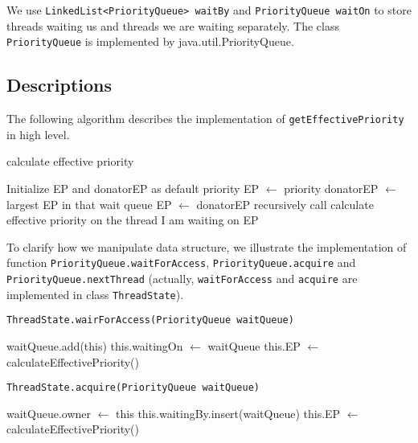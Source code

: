 \documentclass{article}
\begin{document}
\begin{spacing}{1.1}
We use \texttt{LinkedList<PriorityQueue> waitBy} and \texttt{PriorityQueue waitOn} to store threads waiting us and threads we are waiting separately. The class \texttt{PriorityQueue} is implemented by java.util.PriorityQueue.

\subsection{Descriptions}

The following algorithm describes the implementation of \texttt{getEffectivePriority} in high level.

\begin{algorithm}
  \caption{calculate effective priority}
\begin{algorithmic}[1]
  \STATE Initialize EP and donatorEP as default priority
  \STATE EP $\leftarrow$ priority
  \STATE donatorEP $\leftarrow$ largest EP in that wait queue
    \STATE EP $\leftarrow$ donatorEP
  \ENDIF
\ENDFOR
\STATE recursively call calculate effective priority on the thread I am waiting on
\RETURN EP
\end{algorithmic}
\end{algorithm}

To clarify how we manipulate data structure, we illustrate the implementation of function \texttt{PriorityQueue.waitForAccess}, \texttt{PriorityQueue.acquire} and \texttt{PriorityQueue.nextThread} (actually, \texttt{waitForAccess} and \texttt{acquire} are implemented in class \texttt{ThreadState}).

\begin{algorithm}
  \caption{\texttt{ThreadState.wairForAccess(PriorityQueue waitQueue)}}
\begin{algorithmic}[1]
  \STATE waitQueue.add(this)  
  \STATE this.waitingOn $\leftarrow$ waitQueue  
  \STATE this.EP $\leftarrow$ calculateEffectivePriority()  
\RETURN
\end{algorithmic}
\end{algorithm}

\begin{algorithm}
  \caption{\texttt{ThreadState.acquire(PriorityQueue waitQueue)}}
\begin{algorithmic}[1]
  \STATE waitQueue.owner $\leftarrow$ this
  \STATE this.waitingBy.insert(waitQueue)
  \STATE this.EP $\leftarrow$ calculateEffectivePriority()  
\RETURN
\end{algorithmic}
\end{algorithm}


\end{spacing}
\end{document}
